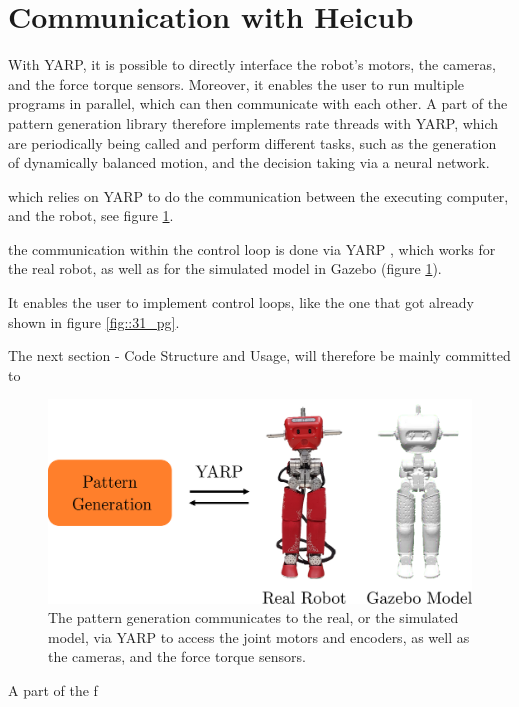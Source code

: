 \section{Communication with Heicub}
\label{sec::34_co}


With YARP, it is possible to directly interface the robot's motors, the cameras, and the force torque sensors. Moreover, it enables the user to run multiple programs in parallel, which can then communicate with each other. A part of the pattern generation library therefore implements rate threads with YARP, which are periodically being called and perform different tasks, such as the generation of dynamically balanced motion, and the decision taking via a neural network.  


which relies on YARP \cite{metta2006yarp} to do the communication between the executing computer, and the robot, see figure \ref{fig::3_yarp}. 





the communication within the control loop is done via YARP \cite{metta2006yarp}, which works for the real robot, as well as for the simulated model in Gazebo \cite{koenig2004design} (figure \ref{fig::3_yarp}). 



It enables the user to implement control loops, like the one that got already shown in figure \ref{fig::31_pg}.

The next section - Code Structure and Usage, will therefore be mainly committed to 




\begin{figure}[h!]
	\centering
	\includegraphics[scale=.25]{chapters/04_methods/img/yarp.png}
	\caption{The pattern generation communicates to the real, or the simulated model, via YARP to access the joint motors and encoders, as well as the cameras, and the force torque sensors.}
	\label{fig::3_yarp}
\end{figure}
A part of the f 
